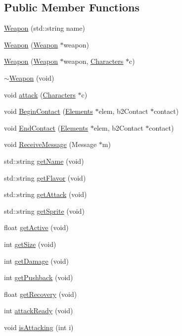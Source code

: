 \subsection*{Public Member Functions}
\begin{DoxyCompactItemize}
\item 
\hyperlink{class_weapon_a7267e890fa563b4f2df8746f443b461a}{Weapon} (std\-::string name)
\item 
\hyperlink{class_weapon_a559c41dbcc415a6ee70112f5231ef83b}{Weapon} (\hyperlink{class_weapon}{Weapon} $\ast$weapon)
\item 
\hyperlink{class_weapon_aa3eb21f28f64908763402004fa802b36}{Weapon} (\hyperlink{class_weapon}{Weapon} $\ast$weapon, \hyperlink{class_characters}{Characters} $\ast$c)
\item 
\hyperlink{class_weapon_aa3364fb5092bbdb4c215e02dd1494f10}{$\sim$\-Weapon} (void)
\item 
void \hyperlink{class_weapon_a90b2b26acbbfc87a14786c8859e4a01d}{attack} (\hyperlink{class_characters}{Characters} $\ast$c)
\item 
void \hyperlink{class_weapon_a866884395ed4c0e7a972bb18e8d7d030}{Begin\-Contact} (\hyperlink{class_elements}{Elements} $\ast$elem, b2\-Contact $\ast$contact)
\item 
void \hyperlink{class_weapon_a1860f840f8c75555de52450300139d9b}{End\-Contact} (\hyperlink{class_elements}{Elements} $\ast$elem, b2\-Contact $\ast$contact)
\item 
void \hyperlink{class_weapon_ad93665811c3df9c05bb22b9a1a9c1a66}{Receive\-Message} (Message $\ast$m)
\item 
std\-::string \hyperlink{class_weapon_aa49263888dca8ee505a95294371adbf6}{get\-Name} (void)
\item 
std\-::string \hyperlink{class_weapon_abe73556e16426da65572d7981dcc800f}{get\-Flavor} (void)
\item 
std\-::string \hyperlink{class_weapon_a693e8f30f48b5df1983c22fdf796f25b}{get\-Attack} (void)
\item 
std\-::string \hyperlink{class_weapon_ace3e431278e9ac23f33d222c67c38497}{get\-Sprite} (void)
\item 
float \hyperlink{class_weapon_aea6024533cc9ca0ce72139ebf5da33f9}{get\-Active} (void)
\item 
int \hyperlink{class_weapon_a47baa57bfa8b9bfeda891d3180caa399}{get\-Size} (void)
\item 
int \hyperlink{class_weapon_a35f92fc79c009c1d1d7d41b4fa17bb11}{get\-Damage} (void)
\item 
int \hyperlink{class_weapon_a60a49fa0a0a76a58698d9b4000815a8b}{get\-Pushback} (void)
\item 
float \hyperlink{class_weapon_a18a362244c6a169db89536505eaa2f15}{get\-Recovery} (void)
\item 
int \hyperlink{class_weapon_aded3e214d38d181504d49719cfc08fa5}{attack\-Ready} (void)
\item 
void \hyperlink{class_weapon_a24f4509a23008f783c566ffa68548fb4}{is\-Attacking} (int i)
\end{DoxyCompactItemize}

